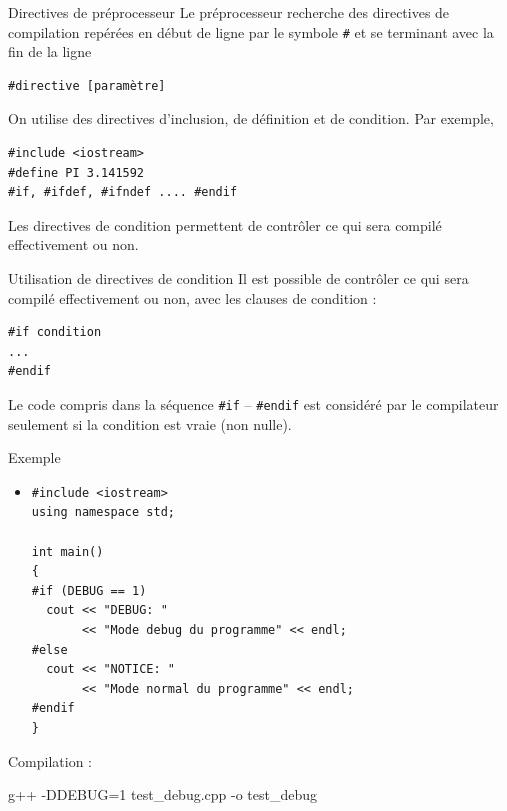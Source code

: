 \documentclass[c]{beamer}
\begin{document}
\begin{frame}[fragile]{Directives de préprocesseur}
 Le préprocesseur recherche des directives de compilation repérées en début de
ligne par le symbole \texttt{\#} et se terminant avec la fin de la ligne

\begin{verbatim}
#directive [paramètre]
\end{verbatim}

On utilise des directives d'inclusion, de définition et de condition. Par exemple,

\begin{verbatim}
#include <iostream>
#define PI 3.141592
#if, #ifdef, #ifndef .... #endif  
\end{verbatim}

Les directives de condition permettent de contrôler ce qui sera compilé effectivement ou non.

\end{frame}


\begin{frame}[fragile,label={sec:orgheadline8}]{Utilisation de directives de condition}
 Il est possible de contrôler ce qui sera compilé effectivement ou non, avec les
clauses de condition :

\begin{verbatim}
#if condition
...
#endif
\end{verbatim}

Le code compris dans la séquence \texttt{\#if} -- \texttt{\#endif} est considéré par le
compilateur seulement si la condition est vraie (non nulle).
\end{frame}

\begin{frame}[fragile,label={sec:orgheadline9}]{Exemple}
 \begin{itemize}
\item {}
\begin{verbatim}
#include <iostream>
using namespace std;

int main()
{
#if (DEBUG == 1)
  cout << "DEBUG: "
       << "Mode debug du programme" << endl;
#else
  cout << "NOTICE: "
       << "Mode normal du programme" << endl;
#endif
}
\end{verbatim}
\end{itemize}

Compilation :
\begin{prompt}
g++ -DDEBUG=1 test\_debug.cpp -o test\_debug
\end{prompt}
\end{frame}
\end{document}
